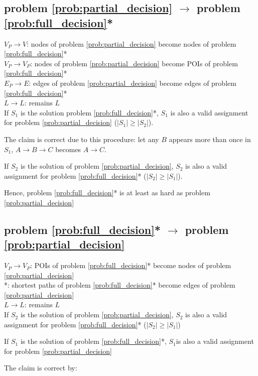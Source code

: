 \subsection{problem \ref{prob:partial_decision} $\to$ problem \ref{prob:full_decision}*}
$V_P \to V$: nodes of problem \ref{prob:partial_decision} become nodes of problem \ref{prob:full_decision}*\\
$V_P \to V_P$: nodes of problem \ref{prob:partial_decision} become POIs of problem \ref{prob:full_decision}*\\
$E_P \to E$: edges of problem \ref{prob:partial_decision} become edges of problem \ref{prob:full_decision}*\\
$L \to L$: remains $L$\\

If $S_1$ is the solution problem \ref{prob:full_decision}*, $S_1$ is also a valid assignment for problem \ref{prob:partial_decision} ($|S_1| \geq |S_2|$).

The claim is correct due to this procedure: let any $B$ appears more than once in $S_1$, $A \to B \to C$ becomes $A \to C$.

If $S_2$ is the solution of problem \ref{prob:partial_decision}, $S_2$ is also a valid assignment for problem \ref{prob:full_decision}* ($|S_2| \geq |S_1|$).

Hence, problem \ref{prob:full_decision}* is at least as hard as problem \ref{prob:partial_decision}

\subsection{problem \ref{prob:full_decision}* $\to$ problem \ref{prob:partial_decision}}

$V_P \to V_P$: POIs of problem \ref{prob:full_decision}* become nodes of problem \ref{prob:partial_decision}\\
*: shortest paths of problem \ref{prob:full_decision}* become edges of problem \ref{prob:partial_decision}\\
$L \to L$: remains $L$\\

If $S_2$ is the solution of problem \ref{prob:partial_decision}, $S_2$ is also a valid assignment for problem \ref{prob:full_decision}* ($|S_2| \geq |S_1|$)

If $S_1$ is the solution of problem \ref{prob:full_decision}*, $S_1$is also a valid assignment for problem \ref{prob:partial_decision}

The claim is correct by:

